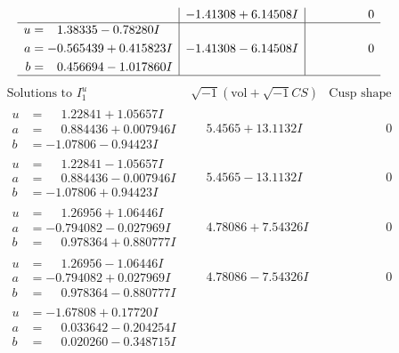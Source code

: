 \documentclass[1p]{elsarticle_modified}
\theoremstyle{definition}
\newcommand{\I}{\sqrt{-1}}
\begin{document}
$$\begin{array}{c|c|c}
 & -1.41308 + 6.14508 I & \phantom{-0.000000 } 0 \\ \hline\begin{aligned}
u &= \phantom{-}1.38335 - 0.78280 I \\
a &= -0.565439 + 0.415823 I \\
b &= \phantom{-}0.456694 - 1.017860 I\end{aligned}
 & -1.41308 - 6.14508 I & \phantom{-0.000000 } 0\\
 \hline 
 \end{array}$$\newpage$$\begin{array}{c|c|c}  
\text{Solutions to }I^u_{1}& \I (\text{vol} + \sqrt{-1}CS) & \text{Cusp shape}\\
 \hline 
\begin{aligned}
u &= \phantom{-}1.22841 + 1.05657 I \\
a &= \phantom{-}0.884436 + 0.007946 I \\
b &= -1.07806 - 0.94423 I\end{aligned}
 & \phantom{-}5.4565 + 13.1132 I & \phantom{-0.000000 } 0 \\ \hline\begin{aligned}
u &= \phantom{-}1.22841 - 1.05657 I \\
a &= \phantom{-}0.884436 - 0.007946 I \\
b &= -1.07806 + 0.94423 I\end{aligned}
 & \phantom{-}5.4565 - 13.1132 I & \phantom{-0.000000 } 0 \\ \hline\begin{aligned}
u &= \phantom{-}1.26956 + 1.06446 I \\
a &= -0.794082 - 0.027969 I \\
b &= \phantom{-}0.978364 + 0.880777 I\end{aligned}
 & \phantom{-}4.78086 + 7.54326 I & \phantom{-0.000000 } 0 \\ \hline\begin{aligned}
u &= \phantom{-}1.26956 - 1.06446 I \\
a &= -0.794082 + 0.027969 I \\
b &= \phantom{-}0.978364 - 0.880777 I\end{aligned}
 & \phantom{-}4.78086 - 7.54326 I & \phantom{-0.000000 } 0 \\ \hline\begin{aligned}
u &= -1.67808 + 0.17720 I \\
a &= \phantom{-}0.033642 - 0.204254 I \\
b &= \phantom{-}0.020260 - 0.348715 I\end{aligned}

\end{array}$$
\end{document}
